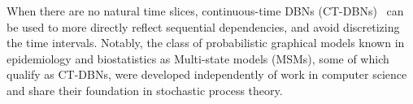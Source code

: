 
When there are no natural time slices, continuous-time DBNs (CT-DBNs)~\cite{Nodelman02} can be used to more directly reflect sequential dependencies, and avoid discretizing the time intervals.  Notably, the class of probabilistic graphical models known in epidemiology and biostatistics as Multi-state models (MSMs), some of which qualify as CT-DBNs, were developed independently of work in computer science and share their foundation in stochastic process theory.



